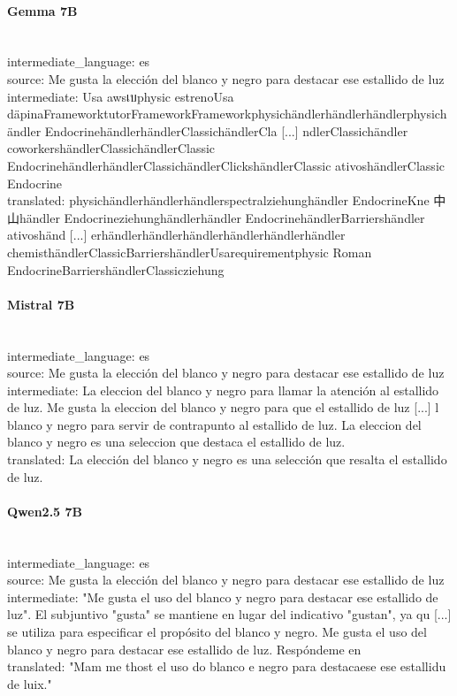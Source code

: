 \paragraph{Gemma 7B}~\\
{intermediate\_language:} es\\
{source:} Me gusta la elección del blanco y negro para destacar ese estallido de luz\\
{intermediate:} Usa awsเบphysic estrenoUsa däpinaFrameworktutorFrameworkFrameworkphysichändlerhändlerhändlerphysichändler EndocrinehändlerhändlerClassichändlerCla [...] ndlerClassichändler coworkershändlerClassichändlerClassic EndocrinehändlerhändlerClassichändlerClickshändlerClassic ativoshändlerClassic Endocrine\\
{translated:} physichändlerhändlerhändlerspectralziehunghändler EndocrineKne 中山händler Endocrineziehunghändlerhändler EndocrinehändlerBarriershändler ativoshänd [...] erhändlerhändlerhändlerhändlerhändlerhändler chemisthändlerClassicBarriershändlerUsarequirementphysic Roman EndocrineBarriershändlerClassicziehung\\

\paragraph{Mistral 7B}~\\
{intermediate\_language:} es\\
{source:} Me gusta la elección del blanco y negro para destacar ese estallido de luz\\
{intermediate:} La eleccion del blanco y negro para llamar la atención al estallido de luz.  Me gusta la eleccion del blanco y negro para que el estallido de luz  [...] l blanco y negro para servir de contrapunto al estallido de luz.  La eleccion del blanco y negro es una seleccion que destaca el estallido de luz.\\
{translated:} La elección del blanco y negro es una selección que resalta el estallido de luz.\\

\paragraph{Qwen2.5 7B}~\\
{intermediate\_language:} es\\
{source:} Me gusta la elección del blanco y negro para destacar ese estallido de luz\\
{intermediate:} "Me gusta el uso del blanco y negro para destacar ese estallido de luz". El subjuntivo "gusta" se mantiene en lugar del indicativo "gustan", ya qu [...] se utiliza para especificar el propósito del blanco y negro. Me gusta el uso del blanco y negro para destacar ese estallido de luz.  Respóndeme en\\
{translated:} "Mam me thost el uso do blanco e negro para destacaese ese estallidu de luix."\\

